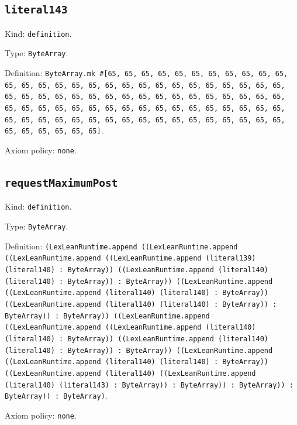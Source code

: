 \documentclass[11pt]{article}
\begin{document}
\subsection*{\texttt{literal143}}
\noindent Kind: \texttt{definition}.\par
\noindent Type: \texttt{ByteArray}.\par
\noindent Definition: \texttt{ByteArray.mk \#[65, 65, 65, 65, 65, 65, 65, 65, 65, 65, 65, 65, 65, 65, 65, 65, 65, 65, 65, 65, 65, 65, 65, 65, 65, 65, 65, 65, 65, 65, 65, 65, 65, 65, 65, 65, 65, 65, 65, 65, 65, 65, 65, 65, 65, 65, 65, 65, 65, 65, 65, 65, 65, 65, 65, 65, 65, 65, 65, 65, 65, 65, 65, 65, 65, 65, 65, 65, 65, 65, 65, 65, 65, 65, 65, 65, 65, 65, 65, 65, 65, 65, 65, 65, 65]}.\par
\noindent Axiom policy: \texttt{none}.\par
\subsection*{\texttt{requestMaximumPost}}
\noindent Kind: \texttt{definition}.\par
\noindent Type: \texttt{ByteArray}.\par
\noindent Definition: \texttt{(LexLeanRuntime.append ((LexLeanRuntime.append ((LexLeanRuntime.append ((LexLeanRuntime.append (literal139) (literal140) : ByteArray)) ((LexLeanRuntime.append (literal140) (literal140) : ByteArray)) : ByteArray)) ((LexLeanRuntime.append ((LexLeanRuntime.append (literal140) (literal140) : ByteArray)) ((LexLeanRuntime.append (literal140) (literal140) : ByteArray)) : ByteArray)) : ByteArray)) ((LexLeanRuntime.append ((LexLeanRuntime.append ((LexLeanRuntime.append (literal140) (literal140) : ByteArray)) ((LexLeanRuntime.append (literal140) (literal140) : ByteArray)) : ByteArray)) ((LexLeanRuntime.append ((LexLeanRuntime.append (literal140) (literal140) : ByteArray)) ((LexLeanRuntime.append (literal140) ((LexLeanRuntime.append (literal140) (literal143) : ByteArray)) : ByteArray)) : ByteArray)) : ByteArray)) : ByteArray)}.\par
\noindent Axiom policy: \texttt{none}.\par
\end{document}
